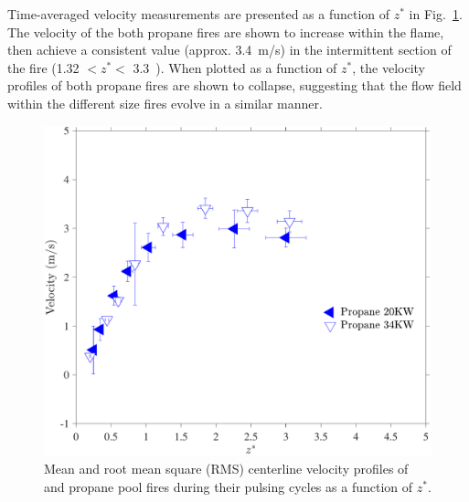 \documentclass[12pt]{ussci}
\begin{document}
Time-averaged velocity measurements are presented as a function of $z^*$ in Fig.~\ref{fig:Vel_Comparison}. The velocity of the both propane fires are shown to increase within the flame, then achieve a consistent value (approx. 3.4~m/s) in the intermittent section of the fire (1.32 $< z^* <$ 3.3~\cite{Baum1989}). When plotted as a function of $z^*$, the velocity profiles of both propane fires are shown to collapse, suggesting that the flow field within the different size fires evolve in a similar manner. 
\begin{figure}[h!]
	\centering
\includegraphics[width=8 cm, keepaspectratio]{Velocity.pdf}
	\caption[Mean and RMS centerline velocity profiles]{Mean and root mean square (RMS) centerline velocity profiles of and propane pool fires during their pulsing cycles as a function of $z^*$.}
	\label{fig:Vel_Comparison}
\end{figure}
\end{document}
